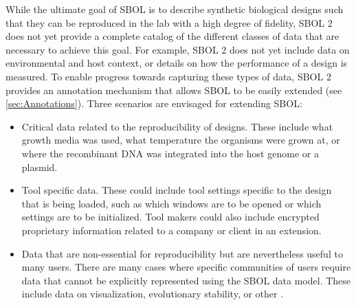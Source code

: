 
While the ultimate goal of SBOL is to describe synthetic biological designs such that they can be reproduced in the lab with a high degree of fidelity, SBOL 2 does not yet provide a complete catalog of the different classes of data that are necessary to achieve this goal. 
For example, SBOL 2 does not yet include data on environmental and host context, or details on how the performance of a design is measured. 
To enable progress towards capturing these types of data, SBOL 2 provides an annotation mechanism that allows SBOL to be easily extended (see \ref{sec:Annotations}). Three scenarios are envisaged for extending SBOL:

\begin{itemize}
\item Critical data related to the reproducibility of designs. These include  what growth media was used, what temperature the organisms were grown at, or where the recombinant DNA was integrated into the host genome or a plasmid.
\item Tool specific data. These could include tool settings specific to the design that is being loaded, such as which windows are to be opened or which settings are to be initialized. Tool makers could also include encrypted proprietary information related to a company or client in an extension. 
\item Data that are non-essential for  reproducibility but are nevertheless useful to many users. There are many cases where specific communities of users require data that cannot be explicitly represented using the SBOL data model. These include data on visualization, evolutionary stability, or other .
\end{itemize}

